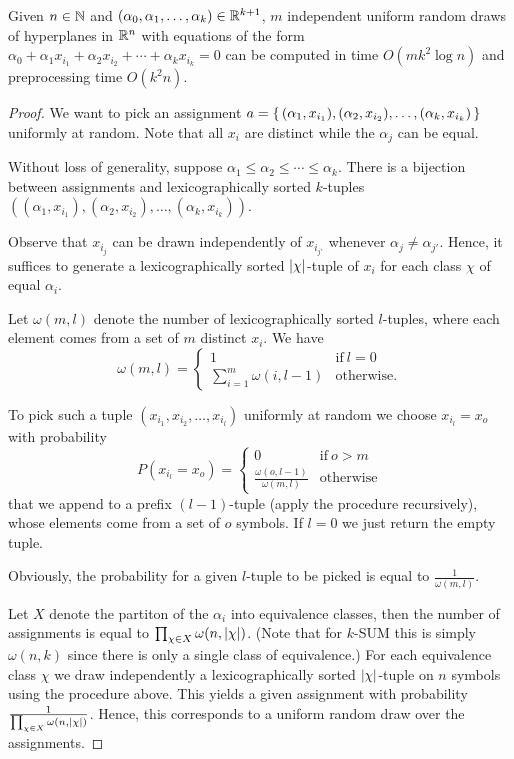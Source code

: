 \begin{lemma}
	Given $n\in\mathbb{N}$ and $(\alpha_0,\alpha_1,\ldots,\alpha_k) \in \mathbb{R}^{k+1}$,
	$m$ independent uniform random draws of
	hyperplanes in $\mathbb{R}^n$ with equations of the form
	$\alpha_0 + \alpha_1 x_{i_1} + \alpha_2 x_{i_2} + \cdots + \alpha_k x_{i_k} = 0$
	can be computed in time $O(mk^2 \log n)$
	and preprocessing time $O(k^2 n)$.
\end{lemma}
\begin{proof}
	We want to pick
	an assignment
	$a=\left\{\,{(\alpha_1,x_{i_1}),(\alpha_2,x_{i_2}),\ldots,(\alpha_k,x_{i_k})}\,\right\}$
	uniformly at random. Note that all $x_i$ are distinct while the $\alpha_j$
	can be equal.

	Without loss of generality, suppose $\alpha_1 \le \alpha_2 \le \cdots \le
	\alpha_k$. There is a bijection between assignments and lexicographically
	sorted $k$-tuples
	$((\alpha_1,x_{i_1}),(\alpha_2,x_{i_2}),\ldots,(\alpha_k,x_{i_k}))$.

	Observe that $x_{i_j}$ can be drawn independently of $x_{i_{j'}}$ whenever
	$\alpha_j \neq \alpha_{j'}$. Hence, it suffices to generate a lexicographically sorted
	$|{\chi}|$-tuple of $x_i$ for each class $\chi$ of equal $\alpha_i$.

	Let $\omega(m,l)$ denote the number of lexicographically sorted $l$-tuples,
	where each element comes from a set of $m$ distinct $x_i$.
	We have
	$$
		\omega(m,l) = \begin{cases}
			1 & \text{if}\ l = 0\\
			\sum_{i=1}^{m}\omega(i,l-1) & \text{otherwise.}
		\end{cases}
	$$

	To pick such a tuple $(x_{i_1},x_{i_2},\ldots,x_{i_l})$ uniformly at random
	we choose $x_{i_l} = x_o$ with probability
	$$
		P(x_{i_l} = x_o) = \begin{cases}
			0 & \text{if}\ o > m\\
			\frac{\omega(o,l-1)}{\omega(m,l)} & \text{otherwise}
		\end{cases}
	$$
	that we append to a prefix $(l-1)$-tuple (apply the procedure recursively),
	whose elements come from a set of $o$ symbols. If $l=0$ we just
	return the empty tuple.

	Obviously, the probability for a given $l$-tuple to be picked is equal to
	$\frac{1}{\omega(m,l)}$.

	Let $X$ denote the partiton of the $\alpha_i$ into equivalence classes,
	then the number of
	assignments is equal to $\prod_{\chi \in X}\omega(n,|{\chi}|)$.
	(Note that for $k$-SUM this is simply $\omega(n,k)$ since there is only a
	single class of equivalence.)
	For each equivalence class $\chi$ we draw independently a lexicographically
	sorted $|{\chi}|$-tuple on $n$ symbols using the procedure
	above. This yields a given assignment with probability
	$\frac{1}{\prod_{\chi \in X}\omega(n,|{\chi}|)}$.
	Hence, this corresponds to a uniform random draw over the assignments.


\end{proof}
